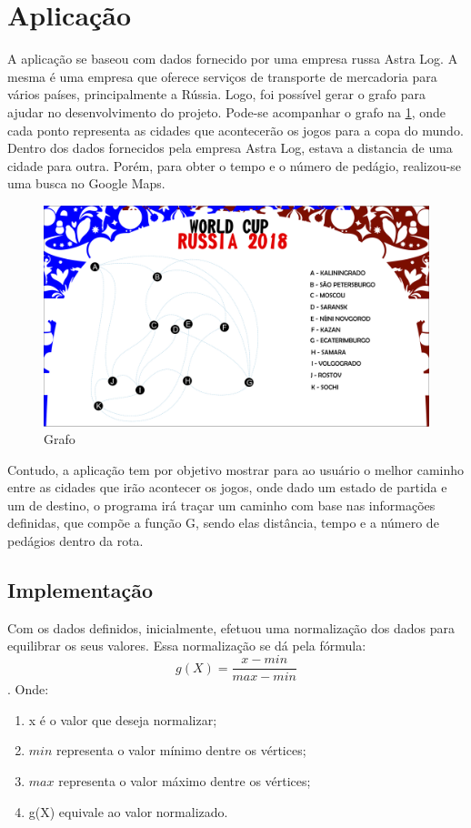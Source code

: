 \documentclass[12pt]{article}
\begin{document}
\section{Aplicação}
A aplicação se baseou com dados fornecido por uma empresa russa Astra Log. A mesma é uma empresa que oferece serviços de transporte de mercadoria para vários países, principalmente a Rússia. Logo, foi possível gerar o grafo para ajudar no desenvolvimento do projeto. Pode-se acompanhar o grafo na \ref{fig:fig1}, onde cada ponto representa as cidades que acontecerão os jogos para a copa do mundo. Dentro dos dados fornecidos pela empresa Astra Log, estava a distancia de uma cidade para outra. Porém, para obter o tempo e o número de pedágio, realizou-se uma busca no Google Maps. 
\begin{figure}[h]
	\centering
	\includegraphics[width=0.9\columnwidth]{imagem/GRAFO}
	\caption{Grafo}
	\label{fig:fig1}
\end{figure}
Contudo, a aplicação tem por objetivo mostrar para ao usuário o melhor caminho entre as cidades que irão acontecer os jogos, onde dado um estado de partida e um de destino, o programa irá traçar um caminho com base nas informações definidas, que compõe a função G, sendo elas distância, tempo e a número de pedágios dentro da rota.
\subsection{Implementação}
Com os dados definidos, inicialmente, efetuou uma normalização dos dados para equilibrar os seus valores. Essa normalização se dá pela fórmula: \[ g(X) = \frac{x - min}{max - min} \]. Onde:
\begin{enumerate}
	\item x é o valor que deseja normalizar;
	\item $min$ representa o valor mínimo dentre os vértices;
	\item $max$ representa o valor máximo dentre os vértices;
	\item g(X) equivale ao valor normalizado. 
\end{enumerate}
\end{document}
